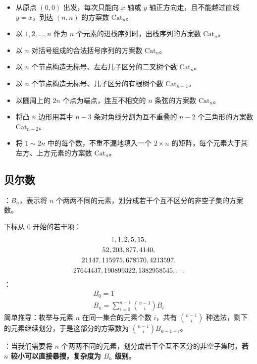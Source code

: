 \begin{itemize}
    \item 从原点 $(0, 0)$ 出发，每次只能向 $x$ 轴或 $y$ 轴正方向走，且不能越过直线 $y = x$，到达 $(n, n)$ 的方案数 $\mathrm{Cat}_n$。
    \item 以 $1, 2, \dots, n$ 作为 $n$ 个元素的进栈序列时，出栈序列的方案数 $\mathrm{Cat}_n$。
    \item 以 $n$ 对括号组成的合法括号序列的方案数 $\mathrm{Cat}_n$。
    \item 以 $n$ 个节点构造无标号、左右儿子区分的二叉树个数 $\mathrm{Cat}_n$。
    \item 以 $n$ 个节点构造无标号、儿子区分的有根树个数 $\mathrm{Cat}_{n - 1}$。
    \item 以圆周上的 $2n$ 个点为端点，连互不相交的 $n$ 条弦的方案数 $\mathrm{Cat}_n$。
    \item 将凸 $n$ 边形用其中 $n - 3$ 条对角线分割为互不重叠的 $n - 2$ 个三角形的方案数 $\mathrm{Cat}_{n - 2}$。
    \item 将 $1 \sim 2n$ 中的每个数，不重不漏地填入一个 $2 \times n$ 的矩阵，每个元素大于其左方、上方元素的方案数 $\mathrm{Cat}_n$。
\end{itemize}

\subsection{贝尔数}

：$B_n$，表示将 $n$ 个两两不同的元素，划分成若干个互不区分的非空子集的方案数。

下标从 $0$ 开始的若干项：
\[
\begin{gathered}
\textcolor{gray}{1}, 1, 2, 5, 15, \\
52, 203, 877, 4140, \\
21147, 115975, 678570, 4213597, \\
27644437, 190899322, 1382958545, \dots
\end{gathered}
\]
：
\[
\begin{gathered}
B_0 = 1 \\
B_n = \sum_{i = 0}^{n - 1} \binom{n - 1}{i}B_i
\end{gathered}
\]
简单推导：枚举与元素 $n$ 在同一集合的元素个数 $i$，共有 $\binom{n - 1}{i}$ 种选法，剩下的元素继续划分，于是这部分的方案数为 $\binom{n - 1}{i}B_{n - 1 - i}$。

：当我们需要将 $n$ 个两两不同的元素，划分成若干个互不区分的非空子集时，\textbf{若 $n$ 较小可以直接暴搜，复杂度为 $B_n$ 级别}。

